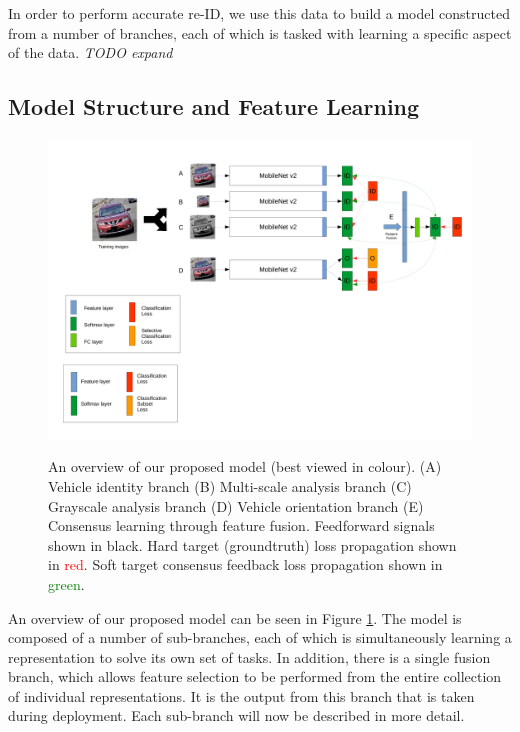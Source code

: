 \documentclass[10pt,twocolumn,letterpaper]{article}
\begin{document}

In order to perform accurate re-ID, we use this data to build a model
constructed from a number of branches, each of which is tasked with learning a
specific aspect of the data. \emph{TODO expand}

\subsection{Model Structure and Feature Learning}

\begin{figure}
  \includegraphics[width=\linewidth,trim=0cm 8cm 0cm 0cm,clip=true]{images/system_overview_orient_only.pdf}
  \label{F:overview}
  \caption{An overview of our proposed model (best viewed in colour). (A) Vehicle identity branch (B) Multi-scale analysis branch (C) Grayscale analysis branch (D) Vehicle orientation branch
(E) Consensus learning through feature fusion. Feedforward signals shown in black. Hard target (groundtruth) loss propagation shown in \textcolor{red}{red}. Soft target consensus feedback loss propagation shown in \textcolor{green}{green}.}
\end{figure}

An overview of our proposed model can be seen in Figure \ref{F:overview}. The model is composed of a number of sub-branches, each of which is simultaneously learning a representation to solve its own set of tasks. In addition, there is a single fusion branch, which allows feature selection to be performed from the entire collection of individual representations. It is the output from this branch that is taken during deployment. Each sub-branch will now be described in more detail.
\end{document}
